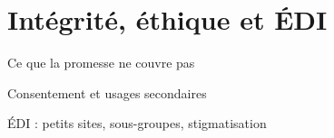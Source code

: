 \section{Intégrité, éthique et ÉDI}

\begin{frame}{Ce que la promesse ne couvre pas}
\end{frame}

\begin{frame}{Consentement et usages secondaires}
\end{frame}

\begin{frame}{ÉDI : petits sites, sous-groupes, stigmatisation}
\end{frame}

